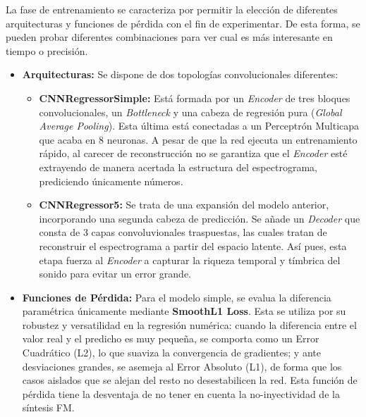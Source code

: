 \documentclass[12pt, a4paper]{article}
\begin{document}
La fase de entrenamiento se caracteriza por permitir la elección de diferentes arquitecturas y funciones de pérdida con el fin de experimentar. De esta 
forma, se pueden probar diferentes combinaciones para ver cual es más interesante en tiempo o precisión.
\begin{itemize}
 \item \textbf{Arquitecturas: }Se dispone de dos topologías convolucionales diferentes:
    \begin{itemize}
        \item \textbf{CNNRegressorSimple: }Está formada por un \textit{Encoder} de tres bloques convolucionales,
        un \textit{Bottleneck} y una cabeza de regresión pura (\textit{Global Average Pooling}). Esta última está conectadas
        a un Perceptrón Multicapa que acaba en 8 neuronas. A pesar de que la red ejecuta un entrenamiento rápido, al carecer de reconstrucción 
        no se garantiza que el \textit{Encoder} esté extrayendo de manera acertada la estructura del espectrograma, prediciendo únicamente números.
          
        \item \textbf{CNNRegressor5: }Se trata de una expansión del modelo anterior, incorporando una segunda cabeza de predicción. 
        Se añade un \textit{Decoder} que consta de 3 capas convoluvionales traspuestas, las cuales tratan de reconstruir el espectrograma 
        a partir del espacio latente. Así pues, esta etapa fuerza al \textit{Encoder} a capturar la riqueza temporal y tímbrica del sonido para evitar
        un error grande.
    \end{itemize}
 \item \textbf{Funciones de Pérdida: } Para el modelo simple, se evalua la diferencia paramétrica únicamente mediante
        \textbf{SmoothL1 Loss}. Esta se utiliza por su robustez y versatilidad en la regresión numérica: cuando la diferencia 
        entre el valor real y el predicho es muy pequeña, se comporta como un Error Cuadrático (L2), lo que suaviza la convergencia
        de gradientes; y ante desviaciones grandes, se asemeja al Error Absoluto (L1), de forma que los casos aislados que se alejan del resto 
        no desestabilicen la red. Esta función de pérdida tiene la desventaja de no tener en cuenta la no-inyectividad de la síntesis FM.


\end{itemize}
\end{document}
